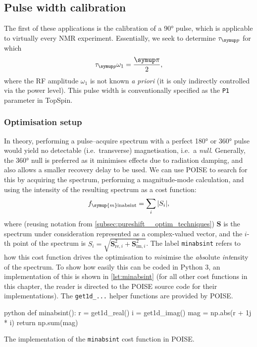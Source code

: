 \subsection{Pulse width calibration}
\label{subsec:poise__pulsecal}

The first of these applications is the calibration of a \ang{90} \proton{} pulse, which is applicable to virtually every NMR experiment.
Essentially, we seek to determine $\taup$ for which
\begin{equation}
    \label{eq:pw90}
    \taup \omega_1 = \frac{\cpi}{2},
\end{equation}
where the RF amplitude $\omega_1$ is not known \textit{a priori} (it is only indirectly controlled via the power level).
This pulse width is conventionally specified as the \texttt{P1} parameter in TopSpin.

\subsubsection{Optimisation setup}

In theory, performing a pulse--acquire spectrum with a perfect \ang{180} or \ang{360} pulse would yield no detectable (i.e.\ transverse) magnetisation, i.e.\ a \textit{null}.
Generally, the \ang{360} null is preferred as it minimises effects due to radiation damping, and also allows a smaller recovery delay to be used.
We can use POISE to search for this by acquiring the spectrum, performing a magnitude-mode calculation, and using the intensity of the resulting spectrum as a cost function:
\begin{equation}
    \label{eq:minabsint}
    f_{\symup{m}\text{inabsint}} = \sum_i |S_i|,
\end{equation}
where (reusing notation from \cref{subsec:pureshift__optim_techniques}) $\symbf{S}$ is the spectrum under consideration represented as a complex-valued vector, and the $i$-th point of the spectrum is $S_i = \sqrt{\symbf{S}_{\text{re},i}^2 + \symbf{S}_{\text{im},i}^2}$.
The label \texttt{minabsint} refers to how this cost function drives the optimisation to \textit{min}imise the \textit{abs}olute \textit{int}ensity of the spectrum.
To show how easily this can be coded in Python 3, an implementation of this is shown in \cref{lst:minabsint} (for all other cost functions in this chapter, the reader is directed to the POISE source code for their implementations).
The \texttt{get1d\_...} helper functions are provided by POISE.

\begin{mylisting}[htb]
\begin{tcbminted}{python}
def minabsint():
    r = get1d_real()
    i = get1d_imag()
    mag = np.abs(r + 1j * i)
    return np.sum(mag)
\end{tcbminted}
\caption[Implementation of \texttt{minabsint} cost function]{The implementation of the \texttt{minabsint} cost function in POISE.}
\label{lst:minabsint}
\end{mylisting}


